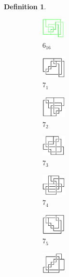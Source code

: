 \documentclass{article}
\theoremstyle{definition}
\newtheorem{defn}[thm]{Definition}
\theoremstyle{theorem}
\theoremstyle{proposition}
\theoremstyle{corollary}
\begin{document}
\begin{defn}
\begin{figure}[H]
\begin{subfigure}{0.075\textwidth}
    \includegraphics[width=1.25cm]{../Midterm_Poster/grid_diagram/theta_6_16.png}
    \caption{$6_{16}$} 
    \end{subfigure}
    \begin{subfigure}{0.075\textwidth}
    \includegraphics[width=1.25cm]{../Midterm_Poster/grid_diagram/theta_7_1.png}
    \caption{$7_{1}$} 
    \end{subfigure}
    \begin{subfigure}{0.075\textwidth}
    \includegraphics[width=1.25cm]{../Midterm_Poster/grid_diagram/theta_7_2.png}
    \caption{$7_{2}$} 
    \end{subfigure}
    \begin{subfigure}{0.075\textwidth}
    \includegraphics[width=1.25cm]{../Midterm_Poster/grid_diagram/theta_7_3.png}
    \caption{$7_{3}$} 
    \end{subfigure}
    \begin{subfigure}{0.075\textwidth}
    \includegraphics[width=1.25cm]{../Midterm_Poster/grid_diagram/theta_7_4.png}
    \caption{$7_{4}$} 
    \end{subfigure}
    \begin{subfigure}{0.075\textwidth}
    \includegraphics[width=1.25cm]{../Midterm_Poster/grid_diagram/theta_7_5.png}
    \caption{$7_{5}$} 
    \end{subfigure}
    \begin{subfigure}{0.075\textwidth}
    \includegraphics[width=1.25cm]{../Midterm_Poster/grid_diagram/theta_7_6.png}

\end{subfigure}
\end{figure}
\end{defn}
\end{document}
